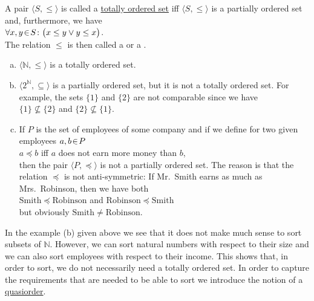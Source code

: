 \begin{Definition} 
  A pair $\langle S, \leq \rangle$ is called a   \href{http://en.wikipedia.org/wiki/Totally_ordered_set}{totally ordered set} 
  iff  $\langle S, \leq \rangle$ is a partially ordered set
  and, furthermore, we have
  \\[0.2cm]
  \hspace*{1.3cm}
  $\forall x, y \!\in\! S \colon\bigl( x \leq y \vee y \leq x\bigr)$.
  \\[0.2cm]
  The relation $\leq$ is then called a  or a . \eox
  \eox
\end{Definition}

\examples
\begin{enumerate}[(a)]
\item $\langle\mathbb{N}, \leq \rangle$ is a totally ordered set.
\item $\langle 2^{\mathbb{N}}, \subseteq \rangle$ is a partially ordered set, but it is not a totally
      ordered set.  For example, the sets $\{1\}$ and $\{2\}$ are not comparable since we have
      \\[0.2cm]
      \hspace*{1.3cm}
      $\{1\} \not\subseteq \{2\}$ \quad and \quad  $\{2\} \not\subseteq \{1\}$.
\item If $P$ is the set of employees of some company and if we define for two given employees
      $a,b \!\in\! P$
      \\[0.2cm]
      \hspace*{1.3cm}
      $a \preceq b$ \quad iff \quad  $a$ does not earn more money than $b$, 
      \\[0.2cm]
      then the pair $\langle P, \preceq \rangle$ is not a partially ordered set.  The reason is that
      the relation $\preceq$ is not anti-symmetric:  If Mr.~Smith earns as much as
      Mrs.~Robinson, then we have both
      \\[0.2cm]
      \hspace*{1.3cm}
      $\mathrm{Smith} \preceq \mathrm{Robinson}$ \quad and \quad $\mathrm{Robinson} \preceq \mathrm{Smith}$
      \\[0.2cm]
      but obviously $\mathrm{Smith} \not= \mathrm{Robinson}$.
\end{enumerate}
In the example (b) given above we see that it does not make much sense to sort subsets of $\mathbb{N}$.
However, we can sort natural numbers with respect to their size and we can also sort employees with
respect to their income.  This shows that, in order to sort,  we do not necessarily need a totally
ordered set.  In order to capture the requirements that are needed to be able to sort we introduce
the notion of a \href{http://en.wikipedia.org/wiki/Preorder}{quasiorder}.


